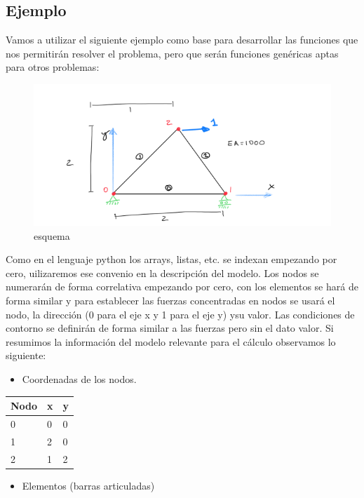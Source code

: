 \documentclass[11pt]{article}
\providecommand{\tightlist}{%
      \setlength{\itemsep}{0pt}\setlength{\parskip}{0pt}}
\begin{document}
    \hypertarget{ejemplo}{%
\subsection{Ejemplo}\label{ejemplo}}

Vamos a utilizar el siguiente ejemplo como base para desarrollar las
funciones que nos permitirán resolver el problema, pero que serán
funciones genéricas aptas para otros problemas:

\begin{figure}
\centering
\includegraphics{esquema.png}
\caption{esquema}
\end{figure}

Como en el lenguaje python los arrays, listas, etc. se indexan empezando
por cero, uilizaremos ese convenio en la descripción del modelo. Los
nodos se numerarán de forma correlativa empezando por cero, con los
elementos se hará de forma similar y para establecer las fuerzas
concentradas en nodos se usará el nodo, la dirección (0 para el eje x y
1 para el eje y) ysu valor. Las condiciones de contorno se definirán de
forma similar a las fuerzas pero sin el dato valor. Si resumimos la
información del modelo relevante para el cálculo observamos lo
siguiente:

\begin{itemize}
\tightlist
\item
  Coordenadas de los nodos.
\end{itemize}

\begin{longtable}[]{@{}lll@{}}
\toprule
Nodo & x & y\tabularnewline
\midrule
\endhead
0 & 0 & 0\tabularnewline
1 & 2 & 0\tabularnewline
2 & 1 & 2\tabularnewline
\bottomrule
\end{longtable}

\begin{itemize}
\tightlist
\item
  Elementos (barras articuladas)
\end{itemize}
\end{document}
